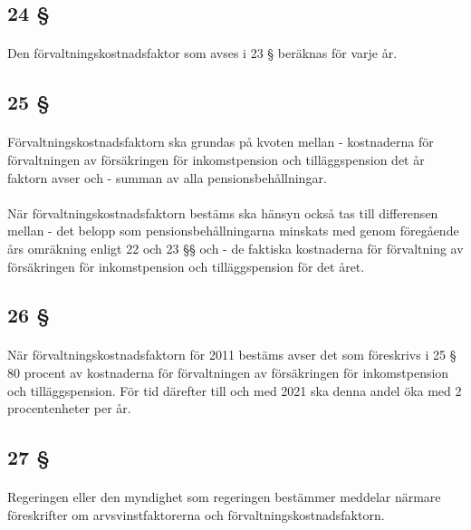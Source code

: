 \documentclass[a4paper,notitlepage,openany,10pt]{book}
\begin{document}
\subsection*{24 §}
\paragraph*{}
Den förvaltningskostnadsfaktor som avses i 23 § beräknas för varje år.
\subsection*{25 §}
\paragraph*{}
Förvaltningskostnadsfaktorn ska grundas på kvoten mellan
\newline - kostnaderna för förvaltningen av försäkringen för inkomstpension och tilläggspension det år faktorn avser och
\newline - summan av alla pensionsbehållningar.
\paragraph*{}
När förvaltningskostnadsfaktorn bestäms ska hänsyn också tas till differensen mellan
\newline - det belopp som pensionsbehållningarna minskats med genom föregående års omräkning enligt 22 och 23 §§ och
\newline - de faktiska kostnaderna för förvaltning av försäkringen för inkomstpension och tilläggspension för det året.
\subsection*{26 §}
\paragraph*{}
När förvaltningskostnadsfaktorn för 2011 bestäms avser det som föreskrivs i 25 § 80 procent av kostnaderna för förvaltningen av försäkringen för inkomstpension och tilläggspension. För tid därefter till och med 2021 ska denna andel öka med 2 procentenheter per år.
\subsection*{27 §}
\paragraph*{}
Regeringen eller den myndighet som regeringen bestämmer meddelar närmare föreskrifter om arvsvinstfaktorerna och förvaltningskostnadsfaktorn.
\end{document}
